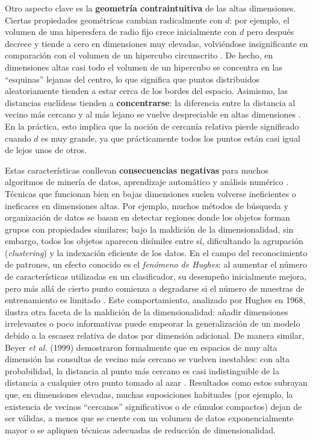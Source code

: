 \documentclass[conference,9pt]{IEEEtran}
\begin{document}
Otro aspecto clave es la \textbf{geometría contraintuitiva} de las altas dimensiones. Ciertas propiedades geométricas cambian radicalmente con $d$: por ejemplo, el volumen de una hiperesfera de radio fijo crece inicialmente con $d$ pero después decrece y tiende a cero en dimensiones muy elevadas, volviéndose insignificante en comparación con el volumen de un hipercubo circunscrito \cite{Verleysen2005}. De hecho, en dimensiones altas casi todo el volumen de un hipercubo se concentra en las “esquinas” lejanas del centro, lo que significa que puntos distribuidos aleatoriamente tienden a estar cerca de los bordes del espacio. Asimismo, las distancias euclídeas tienden a \textbf{concentrarse}: la diferencia entre la distancia al vecino más cercano y al más lejano se vuelve despreciable en altas dimensiones \cite{Beyer1999}. En la práctica, esto implica que la noción de cercanía relativa pierde significado cuando $d$ es muy grande, ya que prácticamente todos los puntos están casi igual de lejos unos de otros.

Estas características conllevan \textbf{consecuencias negativas} para muchos algoritmos de minería de datos, aprendizaje automático y análisis numérico \cite{Zimek2012}. Técnicas que funcionan bien en bajas dimensiones suelen volverse ineficientes o ineficaces en dimensiones altas. Por ejemplo, muchos métodos de búsqueda y organización de datos se basan en detectar regiones donde los objetos forman grupos con propiedades similares; bajo la maldición de la dimensionalidad, sin embargo, todos los objetos aparecen disímiles entre sí, dificultando la agrupación (\emph{clustering}) y la indexación eficiente de los datos. En el campo del reconocimiento de patrones, un efecto conocido es el \emph{fenómeno de Hughes}: al aumentar el número de características utilizadas en un clasificador, su desempeño inicialmente mejora, pero más allá de cierto punto comienza a degradarse si el número de muestras de entrenamiento es limitado \cite{Hughes1968}. Este comportamiento, analizado por Hughes en 1968, ilustra otra faceta de la maldición de la dimensionalidad: añadir dimensiones irrelevantes o poco informativas puede empeorar la generalización de un modelo debido a la escasez relativa de datos por dimensión adicional. De manera similar, Beyer \emph{et al.} (1999) demostraron formalmente que en espacios de muy alta dimensión las consultas de vecino más cercano se vuelven inestables: con alta probabilidad, la distancia al punto más cercano es casi indistinguible de la distancia a cualquier otro punto tomado al azar \cite{Beyer1999}. Resultados como estos subrayan que, en dimensiones elevadas, muchas suposiciones habituales (por ejemplo, la existencia de vecinos “cercanos” significativos o de cúmulos compactos) dejan de ser válidas, a menos que se cuente con un volumen de datos exponencialmente mayor o se apliquen técnicas adecuadas de reducción de dimensionalidad.
\end{document}
